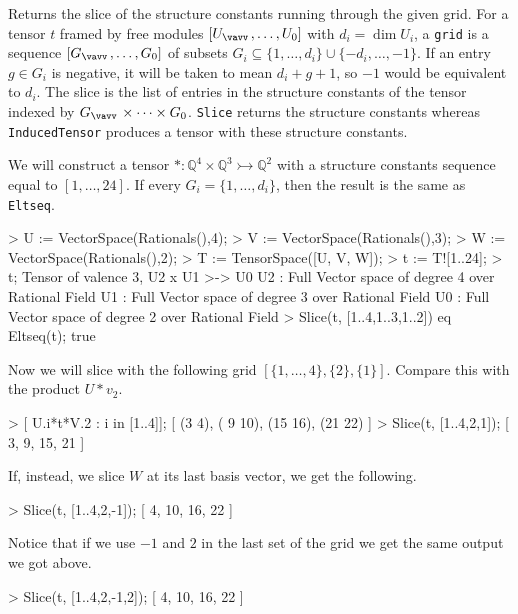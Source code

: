 Returns the slice of the structure constants running through the given grid. 
For a tensor $t$ framed by free modules $[U_{\vav},\dots,U_0]$ with $d_i=\dim U_i$, 
a \texttt{grid} is a sequence $[G_{\vav},\dots,G_0]$ of subsets $G_i\subseteq \{1,\dots, d_i\}\cup \{-d_i,\dots, -1\}$.
If an entry $g\in G_i$ is negative, it will be taken to mean $d_i+g+1$, so $-1$ would be equivalent to $d_i$. 
The slice is the list of entries in the structure constants of the tensor
indexed by $G_{\vav}\times \cdots \times G_0$. \texttt{Slice} returns the structure
constants whereas \texttt{InducedTensor} produces a tensor with these
structure constants.

\begin{example}[TensorSlicing]

We will construct a tensor $*: \mathbb{Q}^4\times \mathbb{Q}^3\rightarrowtail \mathbb{Q}^2$ with a structure constants sequence equal to $[1,\dots,24]$. 
If every $G_i=\{1,\dots, d_i\}$, then the result is the same as \texttt{Eltseq}.
\begin{code}
> U := VectorSpace(Rationals(),4);
> V := VectorSpace(Rationals(),3);
> W := VectorSpace(Rationals(),2);
> T := TensorSpace([U, V, W]);
> t := T![1..24];
> t;
Tensor of valence 3, U2 x U1 >-> U0
U2 : Full Vector space of degree 4 over Rational Field
U1 : Full Vector space of degree 3 over Rational Field
U0 : Full Vector space of degree 2 over Rational Field
> Slice(t, [{1..4},{1..3},{1..2}]) eq Eltseq(t);
true
\end{code}

Now we will slice with the following grid $[\{1,\dots,4\}, \{2\}, \{1\}]$. 
Compare this with the product $U*v_2$.
\begin{code}
> [ U.i*t*V.2 : i in [1..4]];
[
    (3 4),
    ( 9 10),
    (15 16),
    (21 22)
]
> Slice(t, [{1..4},{2},{1}]); 
[ 3, 9, 15, 21 ]
\end{code}

If, instead, we slice $W$ at its last basis vector, we get the following.
\begin{code}
> Slice(t, [{1..4},{2},{-1}]);
[ 4, 10, 16, 22 ]
\end{code}

Notice that if we use $-1$ and $2$ in the last set of the grid we get the same output we got above.
\begin{code}
> Slice(t, [{1..4},{2},{-1,2}]);
[ 4, 10, 16, 22 ]
\end{code}


\end{example}
